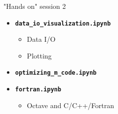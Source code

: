 \begin{frame}{"Hands on" session 2}
\begin{itemize}
\itemsep2em
\item
\textbf{\color{DarkBlue}\texttt{data\_io\_visualization.ipynb}}
\begin{itemize}
\item
Data I/O
\item
Plotting
\end{itemize}

\item
\textbf{\color{DarkBlue}\texttt{optimizing\_m\_code.ipynb}}

\item
\textbf{\color{DarkBlue}\texttt{fortran.ipynb}}
\begin{itemize}
\item
Octave and C/C++/Fortran
\end{itemize}
\end{itemize}
\end{frame}
